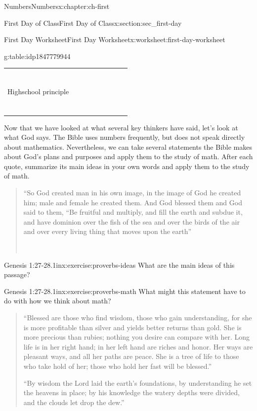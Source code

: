 \documentclass[twoside,10pt,]{book}
\makeatletter
\numberwithin{equation}{chapter}
\newcommand{\hrulethin}  {\noalign{\hrule height 0.04em}}
\newcommand{\tablecelllines}[3]%
{\begin{tabular}[#2]{@{}#1@{}}#3\end{tabular}}
\makeatother
\begin{document}
\begin{chapterptx}{Numbers}{}{Numbers}{}{}{x:chapter:ch-first}
\begin{sectionptx}{First Day of Class}{}{First Day of Class}{}{}{x:section:sec_first-day}
\begin{worksheet-subsection}{First Day Worksheet}{}{First Day Worksheet}{}{}{x:worksheet:first-day-worksheet}
\begin{tableptx}{\textbf{}}{g:table:idp1847779944}{}
{\begin{tabular}{AlAlAlAlA}
{}
\tabularnewline\hrulethin
Highschool principle&&&\tablecelllines{l}{m}
{\\
\\
\\
\\
}
\tabularnewline\hrulethin
\end{tabular}
}%
\end{tableptx}%
\clearpage
Now that we have looked at what several key thinkers have said, let’s look at what God says.  The Bible uses numbers frequently, but does not speak directly about mathematics.  Nevertheless, we can take several statements the Bible makes about God’s plans and purposes and apply them to the study of math.  After each quote, summarize its main ideas in your own words and apply them to the study of math.%
\begin{quote}%
``So God created man in his own image, in the image of God he created him; male and female he created them.  And God blessed them and God said to them, “Be fruitful and multiply, and fill the earth and subdue it, and have dominion over the fish of the sea and over the birds of the air and over every living thing that moves upon the earth''%
\nopagebreak\par%
\hfill{}\\\par
\end{quote}
\begin{divisionexercise}{3}{Genesis 1:27-28.}{1in}{x:exercise:proverbs-ideas}%
What are the main ideas of this passage?\end{divisionexercise}%
\begin{divisionexercise}{4}{Genesis 1:27-28.}{1in}{x:exercise:proverbs-math}%
What might this statement have to do with how we think about math?\end{divisionexercise}%
\begin{quote}%
``Blessed are those who find wisdom, those who gain understanding, for she is more profitable than silver and yields better returns than gold. She is more precious than rubies; nothing you desire can compare with her. Long life is in her right hand; in her left hand are riches and honor. Her ways are pleasant ways, and all her paths are peace. She is a tree of life to those who take hold of her; those who hold her fast will be blessed.''%
\par
``By wisdom the Lord laid the earth’s foundations, by understanding he set the heavens in place; by his knowledge the watery depths were divided, and the clouds let drop the dew.''%

\end{quote}
\end{worksheet-subsection}
\end{sectionptx}
\end{chapterptx}
\end{document}
